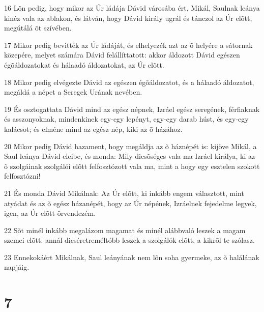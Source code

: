 \par 16 Lõn pedig, hogy mikor az Úr ládája Dávid városába ért, Mikál, Saulnak leánya kinéz vala az ablakon, és látván, hogy Dávid király ugrál és tánczol az Úr elõtt,  megútálá õt szívében.
\par 17 Mikor pedig bevitték az Úr ládáját, és elhelyezék azt az õ helyére a sátornak közepére, melyet számára Dávid felállíttatott: akkor áldozott Dávid egészen égõáldozatokat és hálaadó áldozatokat, az Úr elõtt.
\par 18 Mikor pedig elvégezte Dávid az egészen égõáldozatot, és a hálaadó áldozatot, megáldá a népet a Seregek Urának nevében.
\par 19 És osztogattata Dávid mind az egész népnek, Izráel egész seregének, férfiaknak és asszonyoknak, mindenkinek egy-egy lepényt, egy-egy darab húst, és egy-egy kalácsot; és elméne mind az egész nép, kiki az õ házához.
\par 20 Mikor pedig Dávid hazament, hogy megáldja az õ háznépét is: kijöve Mikál, a Saul leánya Dávid eleibe, és monda: Mily dicsõséges vala ma Izráel királya, ki az õ szolgáinak szolgálói elõtt felfosztózott vala ma, mint a hogy egy esztelen szokott felfosztózni!
\par 21 És monda Dávid Mikálnak: Az Úr elõtt, ki inkább engem választott, mint atyádat és az õ egész házanépét, hogy az Úr népének, Izráelnek fejedelme  legyek, igen, az Úr elõtt örvendezém.
\par 22 Sõt minél inkább megalázom magamat és minél alábbvaló leszek a magam szemei elõtt: annál dicséretreméltóbb leszek a szolgálók elõtt, a kikrõl te szólasz.
\par 23 Ennekokáért Mikálnak, Saul leányának nem lõn soha gyermeke, az õ halálának napjáig.

\chapter{7}


